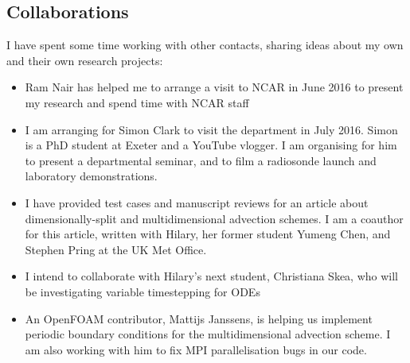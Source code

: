 \documentclass[a4paper,11pt]{article}
\begin{document}
\subsection*{Collaborations}
I have spent some time working with other contacts, sharing ideas about my own and their own research projects:
\begin{itemize}
\item Ram Nair has helped me to arrange a visit to NCAR in June 2016 to present my research and spend time with NCAR staff
\item I am arranging for Simon Clark to visit the department in July 2016.  Simon is a PhD student at Exeter and a YouTube vlogger.  I am organising for him to present a departmental seminar, and to film a radiosonde launch and laboratory demonstrations.
\item I have provided test cases and manuscript reviews for an article about dimensionally-split and multidimensional advection schemes.  I am a coauthor for this article, written with Hilary, her former student Yumeng Chen, and Stephen Pring at the UK Met Office.
\item I intend to collaborate with Hilary's next student, Christiana Skea, who will be investigating variable timestepping for ODEs
\item An OpenFOAM contributor, Mattijs Janssens, is helping us implement periodic boundary conditions for the multidimensional advection scheme.  I am also working with him to fix MPI parallelisation bugs in our code.
\end{itemize}

                                                 
\small{}
\end{document}
